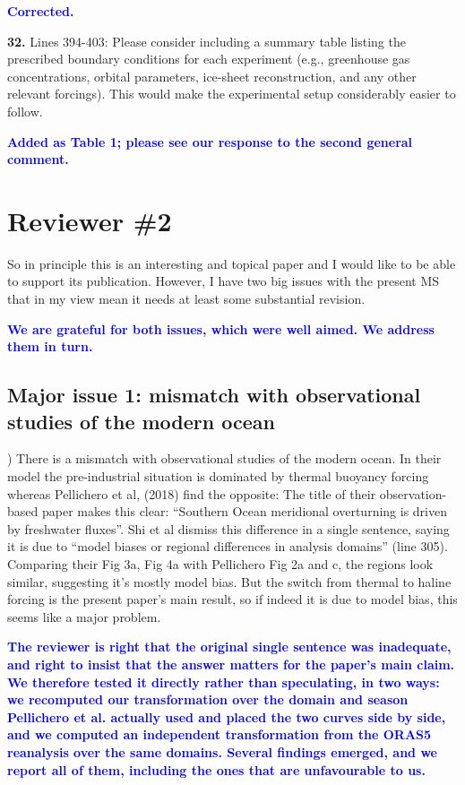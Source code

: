 \documentclass[pdflatex,sn-nature]{sn-jnl}
\begin{document}
\noindent\textcolor{blue}{\textbf{Corrected.}}


\medskip
\noindent \textbf{32.} Lines 394-403: Please consider including a summary table listing the prescribed boundary conditions for each experiment (e.g., greenhouse gas concentrations, orbital parameters, ice-sheet reconstruction, and any other relevant forcings). This would make the experimental setup considerably easier to follow.
\medskip

\noindent\textcolor{blue}{\textbf{Added as Table 1; please see our response to the second general comment.}}




\clearpage
\section*{Reviewer \#2}

\medskip
\noindent So in principle this is an interesting and topical paper and I would like to be able to support its publication. However, I have two big issues with the present MS that in my view mean it needs at least some substantial revision.
\medskip

\noindent\textcolor{blue}{\textbf{We are grateful for both issues, which were well aimed. We address them in turn.}}


\subsection*{Major issue 1: mismatch with observational studies of the modern ocean}

\medskip
{}) There is a mismatch with observational studies of the modern ocean. In their model the pre-industrial situation is dominated by thermal buoyancy forcing whereas Pellichero et al, (2018) find the opposite: The title of their observation-based paper makes this clear: ``Southern Ocean meridional overturning is driven by freshwater fluxes''. Shi et al dismiss this difference in a single sentence, saying it is due to ``model biases or regional differences in analysis domains'' (line 305). Comparing their Fig 3a, Fig 4a with Pellichero Fig 2a and c, the regions look similar, suggesting it's mostly model bias. But the switch from thermal to haline forcing is the present paper's main result, so if indeed it is due to model bias, this seems like a major problem.
\medskip

\noindent\textcolor{blue}{\textbf{The reviewer is right that the original single sentence was inadequate, and right to insist that the answer matters for the paper's main claim. We therefore tested it directly rather than speculating, in two ways: we recomputed our transformation over the domain and season Pellichero et al. actually used and placed the two curves side by side, and we computed an independent transformation from the ORAS5 reanalysis over the same domains. Several findings emerged, and we report all of them, including the ones that are unfavourable to us.}}
\end{document}
